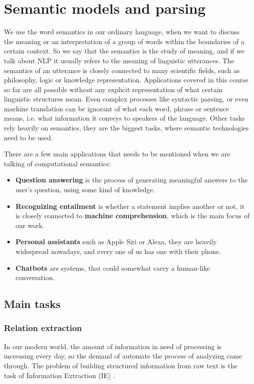 \chapter{Semantic models and parsing}
\label{chap:semanticparsing}
We use the word semantics in our ordinary language, when we want to discuss the meaning or an interpretation of a group of words within the boundaries of a certain context.
So we say that the semantics is the study of meaning, and if we talk about NLP it usually refers to the meaning of linguistic utterances.
The semantics of an utterance is closely connected to many scientific fields, such as philosophy, logic or knowledge representation.
Applications covered in this course so far are all possible without any explicit representation of what certain linguistic structures mean.
Even complex processes like syntactic parsing, or even machine translation can be ignorant of what each word, phrase or sentence means, i.e. what information it conveys to speakers of the language.
Other tasks rely heavily on semantics, they are the biggest tasks, where semantic technologies need to be used.

There are a few main applications that needs to be mentioned when we are talking of computational semantics:
\begin{itemize}
	\item \textbf{Question answering} is the process of generating meaningful answers to the user's question, using some kind of knowledge.
	\item \textbf{Recognizing entailment} is whether a statement implies another or not, it is closely connected to \textbf{machine comprehension}, which is the main focus of our work.
	\item \textbf{Personal assistants} such as Apple Siri or Alexa, they are heavily widespread nowadays, and every one of us has one with their phone.
	\item \textbf{Chatbots} are systems, that could somewhat carry a human-like conversation.
\end{itemize}
\section{Main tasks}
\subsection{Relation extraction}
In our modern world, the amount of information in need of processing is increasing every day, so the demand of automate the process of analyzing came through. The problem of building structured information from raw text is the task of Information Extraction (IE) \cite{Jurafsky:2009}.

